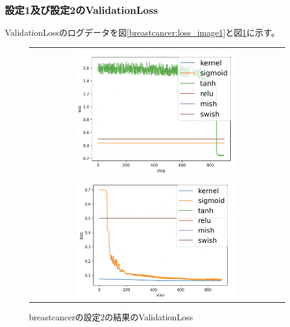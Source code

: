\subsubsection{設定1及び設定2のValidationLoss}
\label{breastcancer:loss}
ValidationLossのログデータを図\ref{breastcancer:loss_image1}と図\ref{breastcancer:loss_image2}に示す。


\begin{figure}[hbtp]
    \begin{center}
        \begin{tabular}{c}
            \begin{minipage}{0.5\hsize}
                \includegraphics[clip, width=7cm]{asset/breastcancer_0.001_1000_3_005_sgd_non_kaiming_uniform}
                    \caption{breastcancerの設定1の結果のValidationLoss}
                    \label{breastcancer:loss_image1}
            \end{minipage}
            \hspace{10pt}
            \begin{minipage}{0.5\hsize}
                \includegraphics[clip, width=7cm]{asset/breastcancer_0.001_1000_3_05_sgd_non_kaiming_uniform}
                    \caption{breastcancerの設定2の結果のValidationLoss}
                    \label{breastcancer:loss_image2}
            \end{minipage}
        \end{tabular}
    \end{center}
\end{figure}


